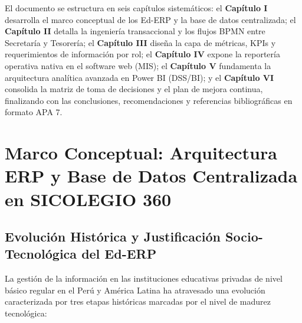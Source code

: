 \documentclass[12pt,a4paper,oneside]{report}
\begin{document}
El documento se estructura en seis capítulos sistemáticos: el \textbf{Capítulo I} desarrolla el marco conceptual de los Ed-ERP y la base de datos centralizada; el \textbf{Capítulo II} detalla la ingeniería transaccional y los flujos BPMN entre Secretaría y Tesorería; el \textbf{Capítulo III} diseña la capa de métricas, KPIs y requerimientos de información por rol; el \textbf{Capítulo IV} expone la reportería operativa nativa en el software web (MIS); el \textbf{Capítulo V} fundamenta la arquitectura analítica avanzada en Power BI (DSS/BI); y el \textbf{Capítulo VI} consolida la matriz de toma de decisiones y el plan de mejora continua, finalizando con las conclusiones, recomendaciones y referencias bibliográficas en formato APA 7.

\chapter{Marco Conceptual: Arquitectura ERP y Base de Datos Centralizada en SICOLEGIO 360}

\section{Evolución Histórica y Justificación Socio-Tecnológica del Ed-ERP}

La gestión de la información en las instituciones educativas privadas de nivel básico regular en el Perú y América Latina ha atravesado una evolución caracterizada por tres etapas históricas marcadas por el nivel de madurez tecnológica:
\end{document}
